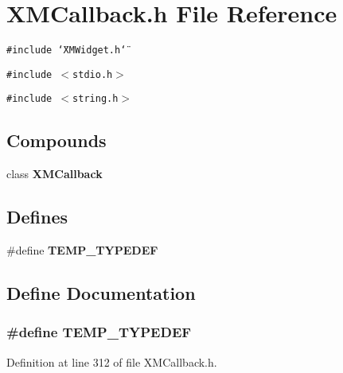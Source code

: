 \section{XMCallback.h File Reference}
\label{XMCallback_8h}
{\tt \#include \char`\"{}XMWidget.h\char`\"{}}\par
{\tt \#include $<$stdio.h$>$}\par
{\tt \#include $<$string.h$>$}\par
\subsection*{Compounds}
\begin{CompactItemize}
\item 
class {\bf XMCallback}
\end{CompactItemize}
\subsection*{Defines}
\begin{CompactItemize}
\item 
\#define {\bf TEMP\_\-TYPEDEF}
\end{CompactItemize}


\subsection{Define Documentation}
\subsubsection{\setlength{\rightskip}{0pt plus 5cm}\#define TEMP\_\-TYPEDEF}\label{XMCallback_8h_a0}




Definition at line 312 of file XMCallback.h.